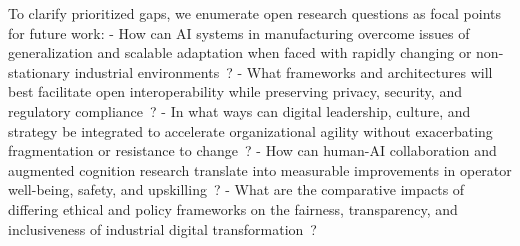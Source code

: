 \documentclass[sigconf]{acmart}
\begin{document}
To clarify prioritized gaps, we enumerate open research questions as focal points for future work:
- How can AI systems in manufacturing overcome issues of generalization and scalable adaptation when faced with rapidly changing or non-stationary industrial environments~\cite{ref19}\cite{ref20}\cite{ref54}?
- What frameworks and architectures will best facilitate open interoperability while preserving privacy, security, and regulatory compliance~\cite{ref13}\cite{ref86}?
- In what ways can digital leadership, culture, and strategy be integrated to accelerate organizational agility without exacerbating fragmentation or resistance to change~\cite{ref93}?
- How can human-AI collaboration and augmented cognition research translate into measurable improvements in operator well-being, safety, and upskilling~\cite{ref45}\cite{ref83}?
- What are the comparative impacts of differing ethical and policy frameworks on the fairness, transparency, and inclusiveness of industrial digital transformation~\cite{ref35}\cite{ref41}\cite{ref90}?
\end{document}
